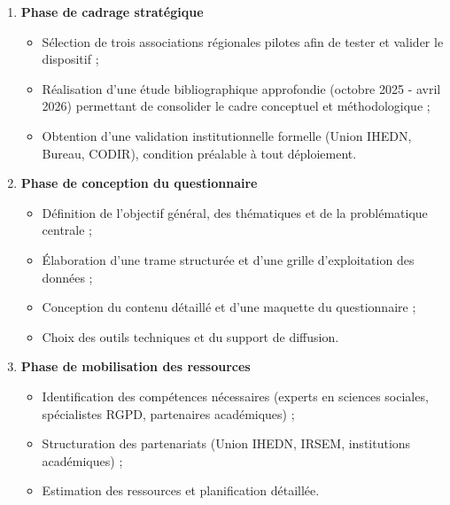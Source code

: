 \documentclass[12pt,a4paper]{article}
\begin{document}
\begin{enumerate}
    \item \textbf{Phase de cadrage stratégique}
    \begin{itemize}
        \item Sélection de trois associations régionales pilotes afin de tester et valider le dispositif ;
        \item Réalisation d'une étude bibliographique approfondie (octobre 2025 - avril 2026) permettant de consolider le cadre conceptuel et méthodologique ;
        \item Obtention d'une validation institutionnelle formelle (Union IHEDN, Bureau, CODIR), condition préalable à tout déploiement.
    \end{itemize}

    \item \textbf{Phase de conception du questionnaire}
    \begin{itemize}
        \item Définition de l'objectif général, des thématiques et de la problématique centrale ;
        \item Élaboration d'une trame structurée et d'une grille d'exploitation des données ;
        \item Conception du contenu détaillé et d'une maquette du questionnaire ;
        \item Choix des outils techniques et du support de diffusion.
    \end{itemize}

    \item \textbf{Phase de mobilisation des ressources}
    \begin{itemize}
        \item Identification des compétences nécessaires (experts en sciences sociales, spécialistes RGPD, partenaires académiques) ;
        \item Structuration des partenariats (Union IHEDN, IRSEM, institutions académiques) ;
        \item Estimation des ressources et planification détaillée.
    \end{itemize}
\end{enumerate}

\newpage
\end{document}
